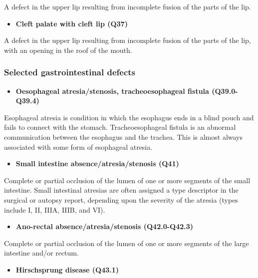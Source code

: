 \documentclass[
]{krantz}
\providecommand{\tightlist}{%
  \setlength{\itemsep}{0pt}\setlength{\parskip}{0pt}}
\begin{document}
A defect in the upper lip resulting from incomplete fusion of the parts of the lip.

\begin{itemize}
\tightlist
\item
  \textbf{Cleft palate with cleft lip (Q37)}
\end{itemize}

A defect in the upper lip resulting from incomplete fusion of the parts of the lip, with an opening in the roof of the mouth.

\hypertarget{section2116}{%
\subsubsection{Selected gastrointestinal defects}\label{section2116}}

\begin{itemize}
\tightlist
\item
  \textbf{Oesophageal atresia/stenosis, tracheoesophageal fistula (Q39.0-Q39.4)}
\end{itemize}

Esophageal atresia is condition in which the esophagus ends in a blind pouch and fails to connect with the stomach. Tracheoesophageal fistula is an abnormal communication between the esophagus and the trachea. This is almost always associated with some form of esophageal atresia.

\begin{itemize}
\tightlist
\item
  \textbf{Small intestine absence/atresia/stenosis (Q41)}
\end{itemize}

Complete or partial occlusion of the lumen of one or more segments of the small intestine. Small intestinal atresias are often assigned a type descriptor in the surgical or autopsy report, depending upon the severity of the atresia (types include I, II, IIIA, IIIB, and VI).

\begin{itemize}
\tightlist
\item
  \textbf{Ano-rectal absence/atresia/stenosis (Q42.0-Q42.3)}
\end{itemize}

Complete or partial occlusion of the lumen of one or more segments of the large intestine and/or rectum.

\begin{itemize}
\tightlist
\item
  \textbf{Hirschsprung disease (Q43.1)}
\end{itemize}
\end{document}
